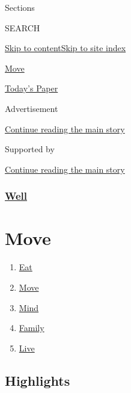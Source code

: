 Sections

SEARCH

\protect\hyperlink{site-content}{Skip to
content}\protect\hyperlink{site-index}{Skip to site index}

\href{https://www.nytimes3xbfgragh.onion/section/well/move}{Move}

\href{https://myaccount.nytimes3xbfgragh.onion/auth/login?response_type=cookie\&client_id=vi}{}

\href{https://www.nytimes3xbfgragh.onion/section/todayspaper}{Today's
Paper}

Advertisement

\protect\hyperlink{after-top}{Continue reading the main story}

Supported by

\protect\hyperlink{after-sponsor}{Continue reading the main story}

\hypertarget{well}{%
\subsubsection{\texorpdfstring{\href{/section/well}{Well}}{Well}}\label{well}}

\hypertarget{move}{%
\section{Move}\label{move}}

\begin{enumerate}
\def\labelenumi{\arabic{enumi}.}
\tightlist
\item
  \href{/section/well/eat}{Eat}
\item
  \href{/section/well/move}{Move}
\item
  \href{/section/well/mind}{Mind}
\item
  \href{/section/well/family}{Family}
\item
  \href{/section/well/live}{Live}
\end{enumerate}

\hypertarget{highlights}{%
\subsection{Highlights}\label{highlights}}

